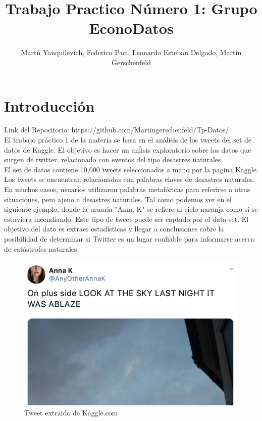 \documentclass[]{article}
\title{Trabajo Practico N\'umero 1: Grupo EconoDatos}
\author{Mart\'n Yanquilevich, Federico Paci, Leonardo Esteban Delgado, Mart\'in Gerschenfeld}
\begin{document}
\maketitle
\tableofcontents
\newpage




\section{Introducci\'on}

Link del Repositorio: https://github.com/Martingerschenfeld/Tp-Datos/\\

El trabajo pr\'actico 1 de la materia se basa en el an\'alisis de los tweets del set de datos de Kaggle. El objetivo es hacer un an\'lisis exploratorio sobre los datos que surgen de twitter, relacionado con eventos del tipo desastres naturales. \\

El set de datos contiene 10,000 tweets seleccionados a mano por la pagina Kaggle. Los tweets se encuentran relacionados con palabras claves de desastres naturales. En muchos casos, usuarios utilizaron palabras metaf\'oricas para referirse a otras situaciones, pero ajeno a desastres naturales. Tal como podemos ver en el siguiente ejemplo, donde la usuaria "Anna K" se refiere al cielo naranja como si se estuviera incendiando. Este tipo de tweet puede ser captado por el data-set. El objetivo del dato es extraer estad\'isticas y llegar a conclusiones sobre la posibilidad de determinar si Twitter es un lugar confiable para informarse acerca de cat\'astrofes naturales.

\begin{figure}[H]
	\centering
	\includegraphics[width=0.75\linewidth]{tweet_screenshot}
	\caption[]{Tweet extraido de Kaggle.com}
\end{figure}
\end{document}
